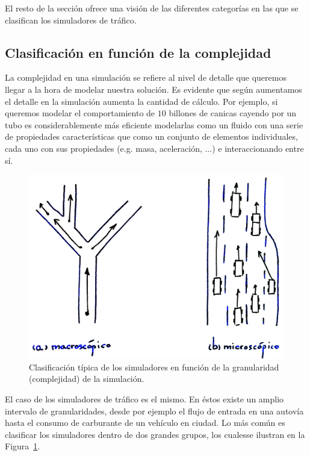 El resto de la sección ofrece una visión de las diferentes categorías en las que se clasifican los simuladores de tráfico.

\subsection{Clasificación en función de la complejidad}

La complejidad en una simulación se refiere al nivel de detalle que queremos llegar a la hora de modelar nuestra solución. Es evidente que según aumentamos el detalle en la simulación aumenta la cantidad de cálculo. Por ejemplo, si queremos modelar el comportamiento de $10$ billones de canicas cayendo por un tubo es considerablemente más eficiente modelarlas como un fluido con una serie de propiedades características que como un conjunto de elementos individuales, cada uno con sus propiedades (e.g. masa, aceleración, ...) e interaccionando entre sí.

\begin{figure}
	\centering
	\includegraphics{images/granularities-in-traffic-simulation}
	\caption{Clasificación típica de los simuladores en función de la granularidad (complejidad) de la simulación.}
	\label{fig:granularities-in-traffic-simulation}
\end{figure}

El caso de los simuladores de tráfico es el mismo. En éstos existe un amplio intervalo de granularidades, desde por ejemplo el flujo de entrada en una autovía hasta el consumo de carburante de un vehículo en ciudad. Lo más común es clasificar los simuladores dentro de dos grandes grupos, los cualesse ilustran en la Figura~\ref{fig:granularities-in-traffic-simulation}.

